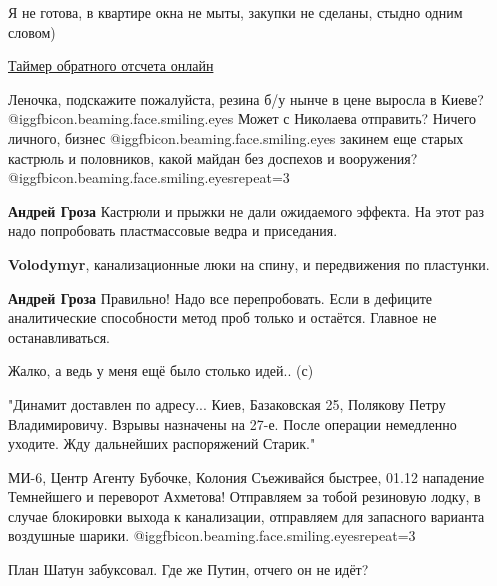 \begin{itemize}
Я не готова, в квартире окна не мыты, закупки не сделаны, стыдно одним словом)


\href{https://countdown.onlinealarmkur.com/ru/#2021-12-01T00:00}{%
Таймер обратного отсчета онлайн%
}


Леночка, подскажите пожалуйста, резина б/у нынче в цене выросла в Киеве?  @igg{fbicon.beaming.face.smiling.eyes} 
Может с Николаева отправить? Ничего личного, бизнес  @igg{fbicon.beaming.face.smiling.eyes}  закинем еще старых
кастрюль и половников, какой майдан без доспехов и вооружения?  @igg{fbicon.beaming.face.smiling.eyes}{repeat=3} 

\begin{itemize} %
\textbf{Андрей Гроза} Кастрюли и прыжки не дали ожидаемого эффекта. На этот раз надо попробовать пластмассовые ведра и приседания.

\textbf{Volodymyr}, канализационные люки на спину, и передвижения по пластунки.

\textbf{Андрей Гроза} Правильно! Надо все перепробовать. Если в дефиците аналитические способности метод проб только и остаётся. Главное не останавливаться.

Жалко, а ведь у меня ещё было столько идей.. (с)
\end{itemize} %


\obeycr
"Динамит доставлен по адресу...
Киев,
Базаковская
25, Полякову Петру
Владимировичу.
Взрывы назначены на
27-е.
После операции немедленно уходите.
Жду дальнейших распоряжений
Старик."
\restorecr

\begin{itemize} %

\obeycr
МИ-6, Центр
Агенту Бубочке, Колония
Съеживайся быстрее, 01.12 нападение Темнейшего и переворот Ахметова!
Отправляем за тобой резиновую лодку, в случае блокировки выхода к канализации, отправляем для запасного варианта воздушные шарики.
 @igg{fbicon.beaming.face.smiling.eyes}{repeat=3} 
\restorecr
\end{itemize} %

План Шатун забуксовал. Где же Путин, отчего он не идёт?



\end{itemize}
